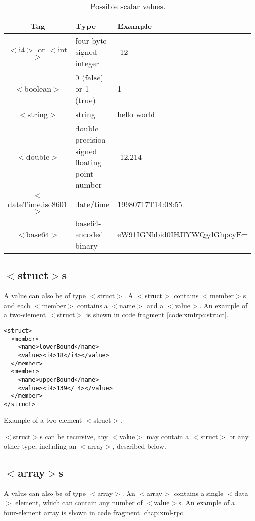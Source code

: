 \begin{table}
\begin{tabular}{| c | p{4cm} | p{6cm} |}
\hline
Tag & Type & Example \\
\hline
$<$i4$>$ or $<$int$>$ & four-byte signed integer & -12 \\
$<$boolean$>$ & 0 (false) or 1 (true) & 1 \\
$<$string$>$ & string & hello world \\
$<$double$>$ & double-precision signed floating point number & -12.214 \\
$<$dateTime.iso8601$>$ & date/time & 19980717T14:08:55 \\
$<$base64$>$ & base64-encoded binary & eW91IGNhbid0IHJlYWQgdGhpcyE= \\
\hline
\end{tabular}
\caption{Possible scalar values.}
\label{tbl:xmlrpc:scalar}
\end{table}


\subsection{$<$struct$>$s}

A value can also be of type $<$struct$>$. A $<$struct$>$ contains $<$member$>$s and each $<$member$>$ contains a $<$name$>$ and a $<$value$>$.
An example of a two-element $<$struct$>$ is shown in code fragment \ref{code:xmlrpc:struct}.

\begin{code}
\begin{lstlisting}
<struct>
  <member>
    <name>lowerBound</name>
    <value><i4>18</i4></value>
  </member>
  <member>
    <name>upperBound</name>
    <value><i4>139</i4></value>
  </member>
</struct>
\end{lstlisting}
\caption{Example of a two-element $<$struct$>$.}
\label{code:xmlrpc:struct}
\end{code}

$<$struct$>$s can be recursive, any $<$value$>$ may contain a $<$struct$>$ or any other type, including an $<$array$>$, described below.
\subsection{$<$array$>$s}

A value can also be of type $<$array$>$.
An $<$array$>$ contains a single $<$data$>$ element, which can contain any number of $<$value$>$s.
An example of a four-element array is shown in code fragment \ref{chap:xml-rpc}.

